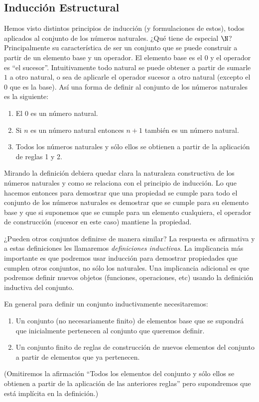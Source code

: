 \subsection{Inducción Estructural}
Hemos visto distintos principios de inducción (y formulaciones de estos), todos aplicados al conjunto de los números naturales.
¿Qué tiene de especial $\N$?
Principalmente su característica de ser un conjunto que se puede construir a partir de un elemento base y un operador.
El elemento base es el $0$ y el operador es ``el sucesor''.
Intuitivamente todo natural se puede obtener a partir de sumarle $1$ a otro natural, o sea de aplicarle el operador sucesor a otro natural (excepto el $0$ que es la base).
Así una forma de definir al conjunto de los números naturales es la siguiente:
\begin{enumerate}
\itemsep 0pt
\item El $0$ es un número natural.
\item Si $n$ es un número natural entonces $n+1$ también es un número natural.
\item Todos los números naturales y sólo ellos se obtienen a partir de la aplicación de reglas 1 y 2.
\end{enumerate}
Mirando la definición debiera quedar clara la naturaleza constructiva de los números naturales y como se relaciona con el principio de inducción.
Lo que hacemos entonces para demostrar que una propiedad se cumple para todo el conjunto de los números naturales es demostrar que se cumple para su elemento base y que si suponemos que se cumple para un elemento cualquiera, el operador de construcción (sucesor en este caso) mantiene la propiedad.

¿Pueden otros conjuntos definirse de manera similar?
La respuesta es afirmativa y a estas definiciones les llamaremos \emph{definiciones inductivas}.
La implicancia más importante es que podremos usar inducción para demostrar propiedades que cumplen otros conjuntos, no sólo los naturales.
Una implicancia adicional es que podremos definir nuevos objetos (funciones, operaciones, etc) usando la definición inductiva del conjunto.

En general para definir un conjunto inductivamente necesitaremos:
\begin{enumerate}
\itemsep 0pt
\item Un conjunto (no necesariamente finito) de elementos base que se supondrá que inicialmente pertenecen al conjunto que queremos definir.
\item Un conjunto finito de reglas de construcción de nuevos elementos del conjunto a partir de elementos que ya pertenecen.
\end{enumerate}
(Omitiremos la afirmación ``Todos los elementos del conjunto y sólo ellos se obtienen a partir de la aplicación de las anteriores reglas'' pero supondremos que está implícita en la definición.)

